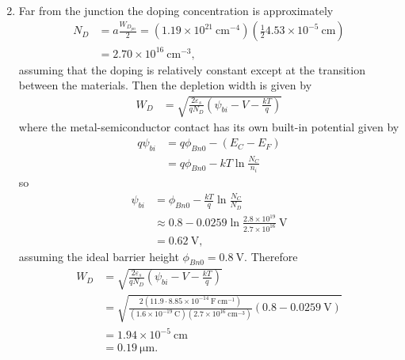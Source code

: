 \documentclass{article}
\begin{document}
\begin{enumerate}
{\begin{align*}
        \end{align*}
       }
       \item{Far from the junction the doping concentration is 
             approximately
             \begin{align*}
             N_D &= a \frac{W_{D_{pn}}}{2} 
                  = (1.19 \times 10^{21} ~\mathrm{cm}^{-4})
                    (\frac{1}{2} 4.53 \times 10^{-5} ~\mathrm{cm}) \\
                 &= 2.70 \times 10^{16} ~\mathrm{cm}^{-3},
             \end{align*}
             assuming that the doping is relatively constant except at the 
             transition between the materials.
             Then the depletion width is given by
             \begin{align*}
             W_D &= \sqrt{\frac{2 \varepsilon_s}
                               {q N_D}
                          \left(\psi_{bi} - V - \frac{kT}{q}\right)}
             \end{align*}
             where the metal-semiconductor contact has its own built-in 
             potential given by
             \begin{align*}
             q\psi_{bi} &= q\phi_{Bn0} - (E_C - E_F) \\
                        &= q\phi_{Bn0} - kT \ln \frac{N_C}{n_i}
             \end{align*}
             so
             \begin{align*}
             \psi_{bi} &= \phi_{Bn0} - \frac{kT}{q} \ln \frac{N_C}{N_D} \\
                       &\approx 0.8
                              - 0.0259 \ln \frac{2.8 \times 10^{19}}
                                                {2.7 \times 10^{16}}~\mathrm{V} \\
                       &= 0.62 ~\mathrm{V},
             \end{align*}
             assuming the ideal barrier height $\phi_{Bn0} = 0.8 ~\mathrm{V}$.
             Therefore
             \begin{align*}
             W_D &= \sqrt{\frac{2 \varepsilon_s}
                               {q N_D}
                          \left(\psi_{bi} - V - \frac{kT}{q}\right)} \\
                 &= \sqrt{\frac{2 (11.9 \cdot 8.85 \times 10^{-14} ~\mathrm{F}~\mathrm{cm}^{-1})}
                               {(1.6 \times 10^{-19} ~\mathrm{C})
                                (2.7 \times 10^{16}  ~\mathrm{cm}^{-3})
                               }(0.8 - 0.0259 ~\mathrm{V})} \\
                 &= 1.94 \times 10^{-5} ~\mathrm{cm} \\
                 &= 0.19 ~\mathrm{\mu m}.
             \end{align*}
       }
\end{enumerate}
\end{document}
